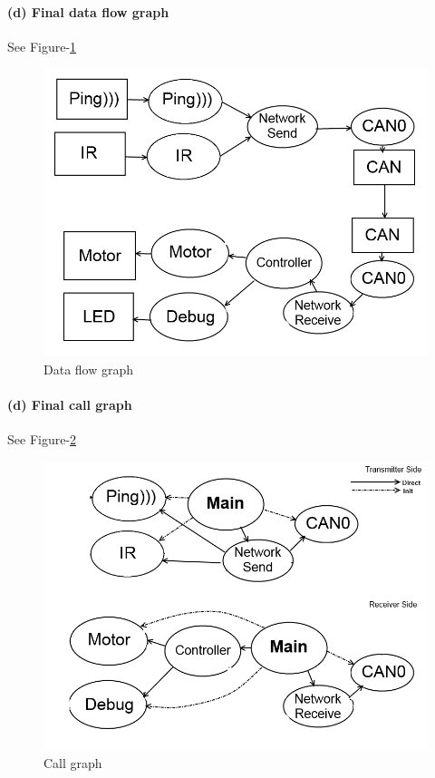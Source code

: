\documentclass[a4paper]{article}
\newlength{\pic}
\begin{document}
\paragraph{(d) Final data flow graph \\}
See Figure-\ref{df}

\setlength{\pic}{0.8\textwidth}
\begin{figure}[htp]
\center
\includegraphics[width=\pic]{pic/dataflow}
\caption{Data flow graph} \label{df}
\end{figure}

\paragraph{(d) Final call graph \\}
See Figure-\ref{cg}

\setlength{\pic}{0.8\textwidth}
\begin{figure}[htp]
\center
\includegraphics[width=\pic]{pic/callgraph}
\caption{Call graph} \label{cg}
\end{figure}
\end{document}
